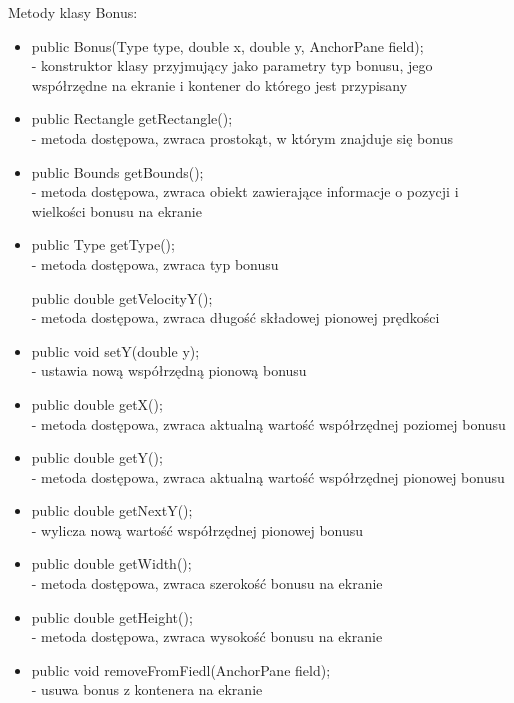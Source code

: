 \documentclass[a4paper]{article}
\begin{document}
\bigskip
Metody klasy Bonus:
\begin{itemize}

\item public Bonus(Type type, double x, double y, AnchorPane field);\\
- konstruktor klasy przyjmujący jako parametry typ bonusu, jego współrzędne na ekranie i kontener do którego jest przypisany
    
\item public Rectangle getRectangle();\\
- metoda dostępowa, zwraca prostokąt, w którym znajduje się bonus

\item public Bounds getBounds();\\
- metoda dostępowa, zwraca obiekt zawierające informacje o pozycji i wielkości bonusu na ekranie

\item public Type getType();\\
- metoda dostępowa, zwraca typ bonusu

public double getVelocityY();\\
- metoda dostępowa, zwraca długość składowej pionowej prędkości
    
\item public void setY(double y);\\
- ustawia nową współrzędną pionową bonusu
    
\item public double getX();\\
- metoda dostępowa, zwraca aktualną wartość współrzędnej poziomej bonusu
    
\item public double getY();\\
- metoda dostępowa, zwraca aktualną wartość współrzędnej pionowej bonusu
    
\item public double getNextY();\\
- wylicza nową wartość współrzędnej pionowej bonusu

\item public double getWidth();\\
- metoda dostępowa, zwraca szerokość bonusu na ekranie
    
\item public double getHeight();\\
- metoda dostępowa, zwraca wysokość bonusu na ekranie

\item public void removeFromFiedl(AnchorPane field);\\
- usuwa bonus z kontenera na ekranie

\end{itemize}
\bigskip
\end{document}
